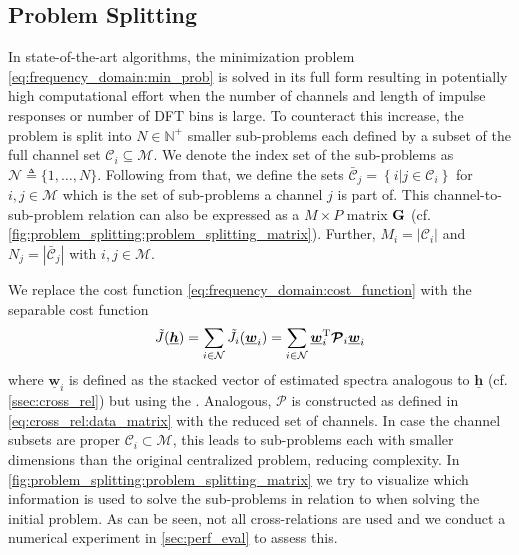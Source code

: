 \documentclass{article}
\newcommand{\hf}{\underline{\bm{h}}}
\newcommand{\wf}{\underline{\bm{w}}}
\newcommand{\aRhof}{\bm{\mathcal{P}}}
\newcommand{\Cset}{\mathcal{C}}
\newcommand{\Csetb}{\bar{\mathcal{C}}}
\newcommand{\Mset}{\mathcal{M}}
\newcommand{\Nset}{\mathcal{N}}
\begin{document}
\subsection{Problem Splitting}
\label{ssec:problem_splitting}
In state-of-the-art algorithms, the minimization problem \eqref{eq:frequency_domain:min_prob} is solved in its full form resulting in potentially high computational effort when the number of channels and length of impulse responses or number of DFT bins is large.
To counteract this increase, the problem is split into \(N \in \mathbb{N}^+\) smaller sub-problems each defined by a subset of the full channel set \(\Cset_i \subseteq \Mset\).
We denote the index set of the sub-problems as \(\Nset \triangleq \{1,\ldots,N\}\).
Following from that, we define the sets \(\Csetb_j = \left\{ i \vert j \in \Cset_i \right\}\) for \(i,j \in \Mset\) which is the set of sub-problems a channel  \(j\) is part of.
This channel-to-sub-problem relation can also be expressed as a \(M \times P\) matrix \(\bm{\mathrm{G}}\) (cf. \autoref{fig:problem_splitting:problem_splitting_matrix}).
Further, \(M_i = \left| \Cset_i \right| \) and \(N_j = \left| \Csetb_j \right| \) with \(i,j \in \Mset\).

We replace the cost function \eqref{eq:frequency_domain:cost_function} with the separable cost function 
\begin{equation}
    \tilde{J}(\hf) = \sum_{i \in \Nset} \tilde{J}_i(\wf_i)  = \sum_{i \in \Nset} \wf_i^\T \aRhof_i \wf_i
\end{equation}
where \(\wf_i\) is defined as the stacked vector of estimated spectra analogous to \(\hf\) (cf. \autoref{ssec:cross_rel}) but using the .
Analogous, \(\aRhof\) is constructed as defined in \eqref{eq:cross_rel:data_matrix} with the reduced set of channels.
In case the channel subsets are proper \(\Cset_i \subset \Mset\), this leads to sub-problems each with smaller dimensions than the original centralized problem, reducing complexity.
In \autoref{fig:problem_splitting:problem_splitting_matrix} we try to visualize which information is used to solve the sub-problems in relation to when solving the initial problem.
As can be seen, not all cross-relations are used and we conduct a numerical experiment in \autoref{sec:perf_eval} to assess this.
\end{document}
